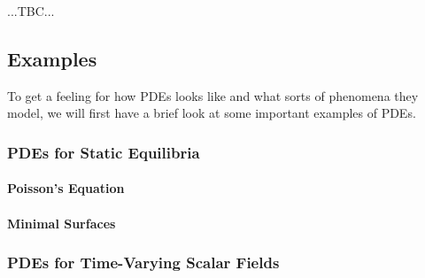 

...TBC...


\subsection{Examples}
To get a feeling for how PDEs looks like and what sorts of phenomena they model, we will first have a brief look at some important examples of PDEs.


\subsubsection{PDEs for Static Equilibria}

\paragraph{Poisson's Equation}



\paragraph{Minimal Surfaces}




\subsubsection{PDEs for Time-Varying Scalar Fields}

